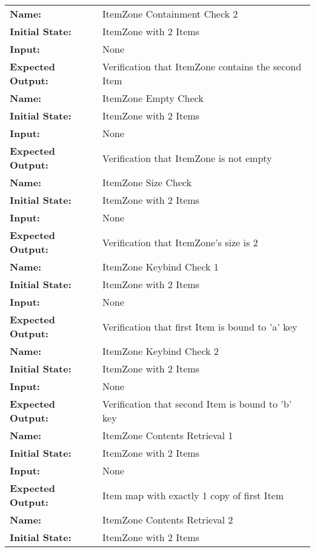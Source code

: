 \documentclass[12pt, titlepage]{article}
\begin{document}
\begin{center}
\begin{longtable}{ l | p{10cm} }
				\hline
				\rule{0pt}{1.5em}\textbf{Name:} & ItemZone Containment Check 2\\
				\textbf{Initial State:} & ItemZone with 2 Items\\
				\textbf{Input:} & None\\
				\textbf{Expected Output:} & Verification that ItemZone contains the second Item\\[0.6em]
				\hline
				\rule{0pt}{1.5em}\textbf{Name:} & ItemZone Empty Check\\
				\textbf{Initial State:} & ItemZone with 2 Items\\
				\textbf{Input:} & None\\
				\textbf{Expected Output:} & Verification that ItemZone is not empty\\[0.6em]
				\hline
				\rule{0pt}{1.5em}\textbf{Name:} & ItemZone Size Check\\
				\textbf{Initial State:} & ItemZone with 2 Items\\
				\textbf{Input:} & None\\
				\textbf{Expected Output:} & Verification that ItemZone's size is 2\\[0.6em]
				\hline
				\rule{0pt}{1.5em}\textbf{Name:} & ItemZone Keybind Check 1\\
				\textbf{Initial State:} & ItemZone with 2 Items\\
				\textbf{Input:} & None\\
				\textbf{Expected Output:} & Verification that first Item is bound to 'a' key\\[0.6em]
				\hline
				\rule{0pt}{1.5em}\textbf{Name:} & ItemZone Keybind Check 2\\
				\textbf{Initial State:} & ItemZone with 2 Items\\
				\textbf{Input:} & None\\
				\textbf{Expected Output:} & Verification that second Item is bound to 'b' key\\[0.6em]
				\hline
				\rule{0pt}{1.5em}\textbf{Name:} & ItemZone Contents Retrieval 1\\
				\textbf{Initial State:} & ItemZone with 2 Items\\
				\textbf{Input:} & None\\
				\textbf{Expected Output:} & Item map with exactly 1 copy of first Item\\[0.6em]
				\hline
				\rule{0pt}{1.5em}\textbf{Name:} & ItemZone Contents Retrieval 2\\
				\textbf{Initial State:} & ItemZone with 2 Items\\

\end{longtable}
\end{center}
\end{document}
